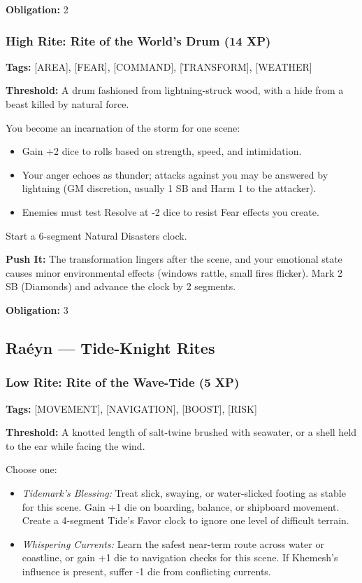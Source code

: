 \textbf{Obligation:} 2

\subsubsection{High Rite: Rite of the World's Drum (14 XP)}

\textbf{Tags:} [AREA], [FEAR], [COMMAND], [TRANSFORM], [WEATHER]

\textbf{Threshold:} A drum fashioned from lightning-struck wood, with a hide from a beast killed by natural force.

You become an incarnation of the storm for one scene:
\begin{itemize}
\item Gain +2 dice to rolls based on strength, speed, and intimidation.
\item Your anger echoes as thunder; attacks against you may be answered by lightning (GM discretion, usually 1 SB and Harm 1 to the attacker).
\item Enemies must test Resolve at -2 dice to resist Fear effects you create.
\end{itemize}
Start a 6-segment Natural Disasters clock.

\textbf{Push It:} The transformation lingers after the scene, and your emotional state causes minor environmental effects (windows rattle, small fires flicker). Mark 2 SB (Diamonds) and advance the clock by 2 segments.

\textbf{Obligation:} 3

\subsection{Raéyn — Tide-Knight Rites}

\subsubsection{Low Rite: Rite of the Wave-Tide (5 XP)}

\textbf{Tags:} [MOVEMENT], [NAVIGATION], [BOOST], [RISK]

\textbf{Threshold:} A knotted length of salt-twine brushed with seawater, or a shell held to the ear while facing the wind.

Choose one:
\begin{itemize}
\item \textit{Tidemark's Blessing:} Treat slick, swaying, or water-slicked footing as stable for this scene. Gain +1 die on boarding, balance, or shipboard movement. Create a 4-segment Tide's Favor clock to ignore one level of difficult terrain.
\item \textit{Whispering Currents:} Learn the safest near-term route across water or coastline, or gain +1 die to navigation checks for this scene. If Khemesh's influence is present, suffer -1 die from conflicting currents.
\end{itemize}

